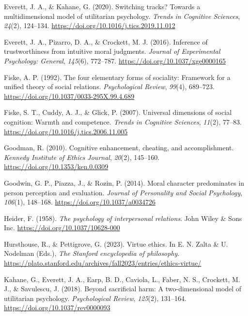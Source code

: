 \documentclass[
  man,
  floatsintext,
  longtable,
  nolmodern,
  notxfonts,
  notimes,
  colorlinks=true,linkcolor=blue,citecolor=blue,urlcolor=blue]{apa7}
\newlength{\cslhangindent}
\newenvironment{CSLReferences}[2] %
 {\begin{list}{}{%
  \setlength{\itemindent}{0pt}
  \setlength{\leftmargin}{0pt}
  \setlength{\parsep}{0pt}
  \ifodd #1
   \setlength{\leftmargin}{\cslhangindent}
   \setlength{\itemindent}{-1\cslhangindent}
  \fi
  \setlength{\itemsep}{#2\baselineskip}}}
 {\end{list}}
\begin{document}
\begin{CSLReferences}{1}{0}
Everett, J. A., \& Kahane, G. (2020). Switching tracks? Towards a
multidimensional model of utilitarian psychology. \emph{Trends in
Cognitive Sciences}, \emph{24}(2), 124--134.
\url{https://doi.org/10.1016/j.tics.2019.11.012}

Everett, J. A., Pizarro, D. A., \& Crockett, M. J. (2016). Inference of
trustworthiness from intuitive moral judgments. \emph{Journal of
Experimental Psychology: General}, \emph{145}(6), 772--787.
\url{https://doi.org/10.1037/xge0000165}

Fiske, A. P. (1992). The four elementary forms of sociality: Framework
for a unified theory of social relations. \emph{Psychological Review},
\emph{99}(4), 689--723. \url{https://doi.org/10.1037/0033-295X.99.4.689}

Fiske, S. T., Cuddy, A. J., \& Glick, P. (2007). Universal dimensions of
social cognition: Warmth and competence. \emph{Trends in Cognitive
Sciences}, \emph{11}(2), 77--83.
\url{https://doi.org/10.1016/j.tics.2006.11.005}

Goodman, R. (2010). Cognitive enhancement, cheating, and accomplishment.
\emph{Kennedy Institute of Ethics Journal}, \emph{20}(2), 145--160.
\url{https://doi.org/10.1353/ken.0.0309}

Goodwin, G. P., Piazza, J., \& Rozin, P. (2014). Moral character
predominates in person perception and evaluation. \emph{Journal of
Personality and Social Psychology}, \emph{106}(1), 148--168.
\url{https://doi.org/10.1037/a0034726}

Heider, F. (1958). \emph{The psychology of interpersonal relations}.
John Wiley \& Sons Inc. \url{https://doi.org/10.1037/10628-000}

Hursthouse, R., \& Pettigrove, G. (2023). Virtue ethics. In E. N. Zalta
\& U. Nodelman (Eds.), \emph{The {Stanford} encyclopedia of philosophy}.
\url{https://plato.stanford.edu/archives/fall2023/entries/ethics-virtue/}

Kahane, G., Everett, J. A., Earp, B. D., Caviola, L., Faber, N. S.,
Crockett, M. J., \& Savulescu, J. (2018). Beyond sacrificial harm: A
two-dimensional model of utilitarian psychology. \emph{Psychological
Review}, \emph{125}(2), 131--164.
\url{https://doi.org/10.1037/rev0000093}


\end{CSLReferences}
\end{document}
